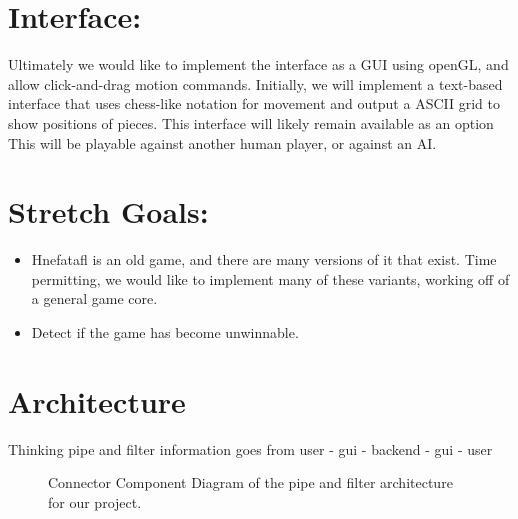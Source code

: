 \documentclass[11pt, oneside]{article}
\begin{document}
\section{Interface:}
Ultimately we would like to implement the interface as a GUI using openGL, and
allow click-and-drag motion commands. Initially, we will implement a text-based
interface that uses chess-like notation for movement and output a ASCII grid to
show positions of pieces. This interface will likely remain available as an
option\\
This will be playable against another human player, or against an AI.

\section{Stretch Goals:}
\begin{itemize}
\item Hnefatafl is an old game, and there are many versions of it that exist.
  Time permitting, we would like to implement many of these variants, working
  off of a general game core.
\item Detect if the game has become unwinnable.
\end{itemize}

\section{Architecture}
Thinking pipe and filter
information goes from user - gui - backend - gui - user
\begin{figure}\label{fig:CCD}
  \centering
  \caption{Connector Component Diagram of the pipe and filter architecture for
    our project.}
\end{figure}
\end{document}
